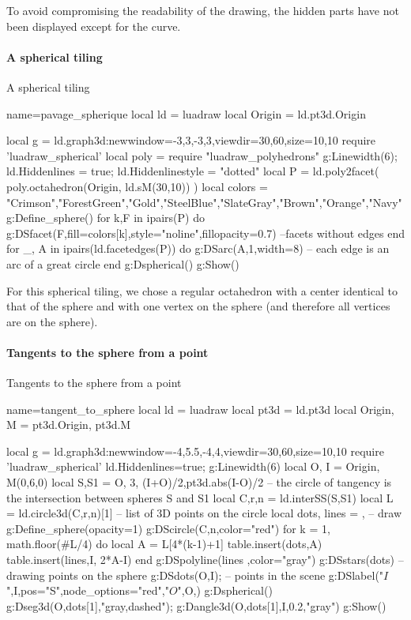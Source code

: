 To avoid compromising the readability of the drawing, the hidden parts have not been displayed except for the curve.

\paragraph{A spherical tiling}

\begin{demo}{A spherical tiling}
\begin{luadraw}{name=pavage_spherique}
local ld = luadraw
local Origin = ld.pt3d.Origin

local g = ld.graph3d:new{window={-3,3,-3,3},viewdir={30,60},size={10,10}}
require 'luadraw_spherical'
local poly = require "luadraw_polyhedrons"
g:Linewidth(6); ld.Hiddenlines = true; ld.Hiddenlinestyle = "dotted"
local P = ld.poly2facet( poly.octahedron(Origin, ld.sM(30,10)) )
local colors = {"Crimson","ForestGreen","Gold","SteelBlue","SlateGray","Brown","Orange","Navy"}
g:Define_sphere()
for k,F in ipairs(P) do
    g:DSfacet(F,{fill=colors[k],style="noline",fillopacity=0.7})  --facets without edges
end
for _, A in ipairs(ld.facetedges(P)) do
    g:DSarc(A,1,{width=8}) -- each edge is an arc of a great circle
end
g:Dspherical()
g:Show()
\end{luadraw}
\end{demo}

For this spherical tiling, we chose a regular octahedron with a center identical to that of the sphere and with one vertex on the sphere (and therefore all vertices are on the sphere).

\paragraph{Tangents to the sphere from a point}

\begin{demo}{Tangents to the sphere from a point}
\begin{luadraw}{name=tangent_to_sphere}
local ld = luadraw
local pt3d = ld.pt3d
local Origin, M = pt3d.Origin, pt3d.M

local g = ld.graph3d:new{window={-4,5.5,-4,4},viewdir={30,60},size={10,10}}
require 'luadraw_spherical'
ld.Hiddenlines=true; g:Linewidth(6)
local O, I = Origin, M(0,6,0)
local S,S1 = {O, 3}, {(I+O)/2,pt3d.abs(I-O)/2}
-- the circle of tangency is the intersection between spheres S and S1
local C,r,n = ld.interSS(S,S1) 
local L = ld.circle3d(C,r,n)[1] -- list of 3D points on the circle
local dots, lines = {}, {}
-- draw
g:Define_sphere({opacity=1})
g:DScircle({C,n},{color="red"})
for k = 1, math.floor(#L/4) do
    local A = L[4*(k-1)+1]
    table.insert(dots,A)
    table.insert(lines,{I, 2*A-I})
end
g:DSpolyline(lines ,{color="gray"})
g:DSstars(dots) -- drawing points on the sphere
g:DSdots({O,I});  -- points in the scene
g:DSlabel("$I$",I,{pos="S",node_options="red"},"$O$",O,{})
g:Dspherical()
g:Dseg3d({O,dots[1]},"gray,dashed"); g:Dangle3d(O,dots[1],I,0.2,"gray")
g:Show() 
\end{luadraw}
\end{demo}

